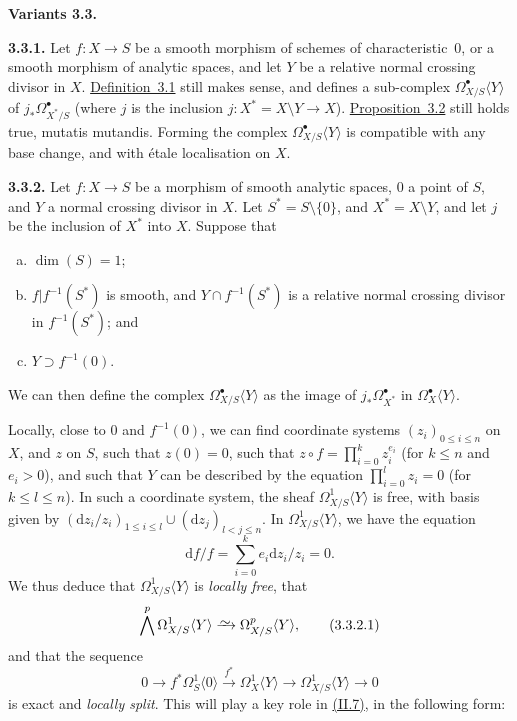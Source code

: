 \documentclass{report}
\newenvironment{rmenv}[1]
  {\phantomsection\par\medskip\noindent\textbf{#1.}\rmfamily}
  {\par\medskip}
\newcommand{\dd}{\mathrm{d}}
\newcommand{\simto}{\xrightarrow{\raisebox{-0.7ex}[0ex][0ex]{$\sim$}}}
\renewcommand{\leq}{\leqslant}
\newcommand{\oldpage}[1]{\marginpar{\footnotesize$\Big\vert$ \textit{p.~#1}}}
\begin{document}
\begin{rmenv}{Variants 3.3}
\label{II.3.3}
  \begin{rmenv}{3.3.1}
  \label{II.3.3.1}
    Let $f\colon X\to S$ be a smooth morphism of schemes of characteristic~$0$, or a smooth morphism of analytic spaces, and let $Y$ be a relative normal crossing divisor in $X$.
    \hyperref[II.3.1]{Definition~3.1} still makes sense, and defines a sub-complex $\Omega_{X/S}^\bullet\langle Y\rangle$ of $j_*\Omega_{X^*/S}^\bullet$ (where $j$ is the inclusion $j\colon X^*=X\setminus Y\to X$).
    \hyperref[II.3.2]{Proposition~3.2} still holds true, mutatis mutandis.
    Forming the complex $\Omega_{X/S}^\bullet\langle Y\rangle$ is compatible with any base change, and with \'{e}tale localisation on $X$.
  \end{rmenv}

  \begin{rmenv}{3.3.2}
  \label{II.3.3.2}
    Let $f\colon X\to S$ be a morphism of smooth analytic spaces, $0$ a point of $S$, and $Y$ a normal crossing divisor in $X$.
    Let $S^*=S\setminus\{0\}$, and $X^*=X\setminus Y$, and let $j$ be the inclusion of $X^*$ into $X$.
    Suppose that
    \begin{enumerate}[(a)]
      \item $\dim(S)=1$;
      \item $f|f^{-1}(S^*)$ is smooth, and $Y\cap f^{-1}(S^*)$ is a relative normal crossing divisor in $f^{-1}(S^*)$; and
      \item $Y\supset f^{-1}(0)$.
    \end{enumerate}

    We can then define the complex $\Omega_{X/S}^\bullet\langle Y\rangle$ as the image of $j_*\Omega_{X^*}^\bullet$ in $\Omega_X^\bullet\langle Y\rangle$.

    Locally, close to $0$ and $f^{-1}(0)$, we can find coordinate systems $(z_i)_{0\leq i\leq n}$ on $X$, and $z$ on $S$, such that $z(0)=0$, such that $z\circ f = \prod_{i=0}^k z_i^{e_i}$ (for $k\leq n$ and $e_i>0$), and such that $Y$ can be described by the equation $\prod_{i=0}^l z_i=0$ (for $k\leq l\leq n$).
    In such a coordinate system, the sheaf $\Omega_{X/S}^1\langle Y\rangle$ is free, with basis given by $(\dd z_i/z_i)_{1\leq i\leq l}\cup(\dd z_j)_{l<j\leq n}$.
    In $\Omega_{X/S}^1\langle Y\rangle$, we have the equation
    \[
      \dd f/f = \sum_{i=0}^k e_i\dd z_i/z_i = 0.
    \]
    We thus deduce that $\Omega_{X/S}^1\langle Y\rangle$ is \emph{locally free}, that
    \[
    \label{II.3.3.2.1}
      \bigwedge^p \Omega_{X/S}^1\langle Y\rangle
      \simto \Omega_{X/S}^p\langle Y\rangle,
    \tag{3.3.2.1}
    \]
    and that the sequence
  \oldpage{75}
    \[
    \label{II.3.3.2.2}
      0
      \to f^*\Omega_S^1\langle0\rangle
      \xrightarrow{f^*} \Omega_X^1\langle Y\rangle
      \to \Omega_{X/S}^1\langle Y\rangle
      \to 0
    \tag{3.3.2.2}
    \]
    is exact and \emph{locally split}.
    This will play a key role in \hyperref[II.7]{(II.7)}, in the following form:


\end{rmenv}
\end{rmenv}
\end{document}
